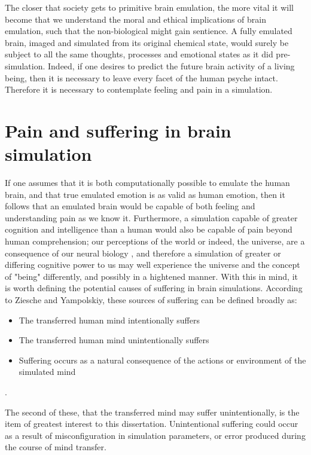 The closer that society gets to primitive brain emulation, the more vital it
will become that we understand the moral and ethical implications of brain
emulation, such that the non-biological might gain sentience. A fully emulated
brain, imaged and simulated from its original chemical state, would surely be
subject to all the same thoughts, processes and emotional states as it did
pre-simulation. Indeed, if one desires to predict the future brain activity of a
living being, then it is necessary to leave every facet of the human psyche
intact. Therefore it is necessary to contemplate feeling and pain in a simulation.

\section{Pain and suffering in brain simulation}

If one assumes that it is both computationally possible to emulate the human
brain, and that true emulated emotion is as valid as human emotion,
then it follows that an emulated brain would be capable of both feeling and
understanding pain as we know it. Furthermore, a simulation capable of greater
cognition and intelligence than a human would also be capable of pain beyond
human comprehension; our perceptions of the world or indeed, the universe, are a
consequence of our neural biology \autocite{eagleman_human_2008}, and therefore
a simulation of greater or differing cognitive power to us may well experience
the universe and the concept of "being" differently, and possibly in a hightened
manner. With this in mind, it is worth defining the potential
causes of suffering in brain simulations. According to Ziesche and Yampolskiy,
these sources of suffering can be defined broadly as:

\begin{itemize}
    \itemsep-0.2em
    \item The transferred human mind intentionally suffers
    \item The transferred human mind unintentionally suffers
    \item Suffering occurs as a natural consequence of the actions or
    environment of the simulated mind
\end{itemize}
\autocite{ziesche_no_2019-1}.

The second of these, that the transferred mind may suffer unintentionally, is
the item of greatest interest to this dissertation. Unintentional suffering
could occur as a result of misconfiguration in simulation parameters, or error
produced during the course of mind transfer. 

